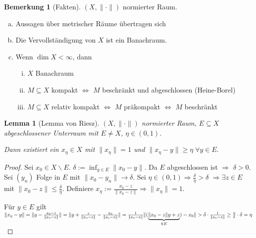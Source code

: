 \documentclass[ngerman]{report}
\theoremstyle{plain}%
\newtheorem{lemma}[thm]{Lemma}
\theoremstyle{definition}%
\theoremstyle{myStyle}
\newtheorem{bem}[thm]{Bemerkung}
\newcommand{\norm}[1]{\|#1\|}
\newcommand{\df}[1][]{%
	\overset{#1}{\Rightarrow}
}
\newcommand{\aq}{\Leftrightarrow} %
\begin{document}
	\begin{bem}[Fakten]
		$(X,\norm{\cdot})$ normierter Raum.
		\begin{enumerate}[a)]
			\item Aussagen über metrischer Räume übertragen sich
			\item Die Vervollständigung von $X$ ist ein Banachraum.
			\item Wenn $\dim X < \infty$, dann
				\begin{enumerate}[i)]
					\item $X$ Banachraum
					\item $M\subseteq X$ kompakt $\aq$ $M$ beschränkt und abgeschlossen (Heine-Borel)
					\item $M\subseteq X$ relativ kompakt $\aq$ $M$ präkompakt  $\aq$ $M$ beschränkt
				\end{enumerate}
		\end{enumerate}
	\end{bem}
\newcommand{\xt}{x_\eta}%

	\begin{lemma}[Lemma von Riesz]
		$(X,\norm{\cdot})$ normierter Raum, $E\subseteq X$ abgeschlossener Unterraum mit $E \not = X$, $\eta\in (0,1)$. \par
		Dann existiert ein $x_\eta \in X$ mit $\norm{\xt} = 1$ und $\norm{\xt - y} \geq \eta \; \forall y\in E.$
	\end{lemma}
	\begin{proof}
		Sei $x_0 \in X\backslash E$. $\delta := \inf_{y\in E} \norm{x_0 - y}$.
		Da $E$ abgeschlossen ist $\df$ $\delta > 0$. Sei $(y_n)$ Folge in $E$ mit $\norm{x_0 - y_n} \to \delta$. 
		Sei $\eta \in (0,1) \df \frac{\delta}{\eta} > \delta $
		$\df \exists z\in E$ mit $\norm{x_0 - z} \leq \frac{\delta}{\eta}.$ Definiere $\xt := \frac{x_0-z}{\norm{x_0 - z}} \df \norm{\xt} = 1$.\par	
		Für $y\in E$ gilt 
		$\norm{\xt - y} = \norm{y - \frac{x_0-z}{\norm{x_0 - z}}} 
		 = \norm{y + \frac{z}{\norm{x_0 - z}} - \frac{x_0}{\norm{x_0 - z}}} 
		 = \frac{1}{\norm{x_0 - z}} \norm{(\underbrace{\norm{x_0 - z}y + z}_{\in E}) - x_0} 
		\vspace{-1em}> \delta\cdot \frac{1}{\norm{x_0 - z}} \geq \frac{\eta}{\delta} \cdot \delta = \eta
		$
	\end{proof}	
\end{document}
